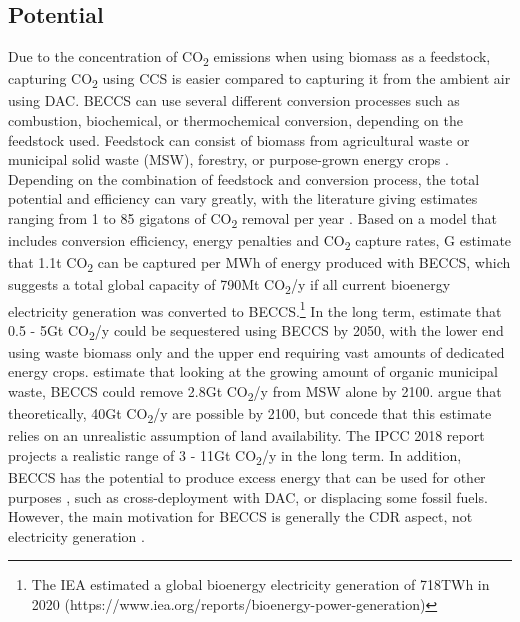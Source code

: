 \subsection*{Potential}
Due to the concentration of CO\textsubscript{2} emissions when using biomass as a feedstock, capturing CO\textsubscript{2} using CCS is easier compared to capturing it from the ambient air using DAC. BECCS can use several different conversion processes such as combustion, biochemical, or thermochemical conversion, depending on the feedstock used. Feedstock can consist of biomass from agricultural waste or municipal solid waste (MSW), forestry, or purpose-grown energy crops \parencite{Dipple2021TheSystems}. Depending on the combination of feedstock and conversion process, the total potential and efficiency can vary greatly, with the literature giving estimates ranging from 1 to 85 gigatons of CO\textsubscript{2} removal per year \parencite[342]{IPCC2018Global1.5C}.
Based on a model that includes conversion efficiency, energy penalties and CO\textsubscript{2} capture rates, G\textcite{Garcia-Freites2021TheTarget} estimate that 1.1t CO\textsubscript{2} can be captured per MWh of energy produced with BECCS, which suggests a total global capacity of 790Mt CO\textsubscript{2}/y if all current bioenergy electricity generation was converted to BECCS.\footnote{The IEA estimated a global bioenergy electricity generation of 718TWh in 2020 (https://www.iea.org/reports/bioenergy-power-generation)}
In the long term, \textcite{Fuss2018NegativeEffects} estimate that 0.5 - 5Gt CO\textsubscript{2}/y could be sequestered using BECCS by 2050, with the lower end using waste biomass only and the upper end requiring vast amounts of dedicated energy crops. \textcite{Pour2018PotentialBECCS} estimate that looking at the growing amount of organic municipal waste, BECCS could remove 2.8Gt CO\textsubscript{2}/y from MSW alone by 2100. \textcite{Hanssen2020TheStorage} argue that theoretically, 40Gt CO\textsubscript{2}/y are possible by 2100, but concede that this estimate relies on an unrealistic assumption of land availability.
The IPCC 2018 report projects a realistic range of 3 - 11Gt CO\textsubscript{2}/y in the long term.
In addition, BECCS has the potential to produce excess energy that can be used for other purposes \textcite{Fajardy2017CanEmissions}, such as cross-deployment with DAC, or displacing some fossil fuels. However, the main motivation for BECCS is generally the CDR aspect, not electricity generation \textcite{Klein2014TheREMIND-MAgPIE}.
